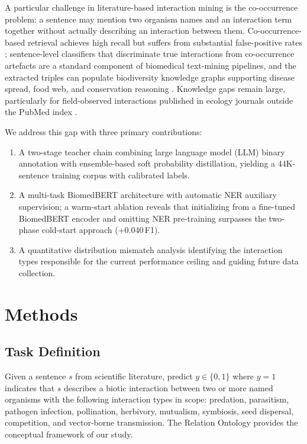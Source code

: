 \documentclass[a4paper,fleqn]{cas-sc}
\begin{document}
A particular challenge in literature-based interaction mining is the
co-occurrence problem: a sentence may mention two organism names and an
interaction term together without actually describing an interaction between
them. Co-occurrence-based retrieval achieves high recall but suffers from
substantial false-positive rates \citep{bunescu2005comparative};
sentence-level classifiers that discriminate true interactions from
co-occurrence artefacts are a standard component of biomedical
text-mining pipelines, and the extracted triples can populate biodiversity
knowledge graphs supporting disease spread, food web, and conservation
reasoning \citep{page2016biodiversity, poisot2021global}. Knowledge gaps
remain large, particularly for field-observed interactions published in
ecology journals outside the PubMed index \citep{poisot2021global}.

We address this gap with three primary contributions:
\begin{enumerate}
    \item A two-stage teacher chain combining large language model (LLM)
    binary annotation with ensemble-based soft probability distillation, yielding a
    44K-sentence training corpus with calibrated labels.
    \item A multi-task BiomedBERT architecture with automatic NER auxiliary
    supervision; a warm-start ablation reveals that initializing from a
    fine-tuned BiomedBERT encoder and omitting NER pre-training surpasses
    the two-phase cold-start approach (+0.040\,F1).
    \item A quantitative distribution mismatch analysis identifying the
    interaction types responsible for the current performance ceiling and
    guiding future data collection.
\end{enumerate}

\section{Methods}
\label{sec:methods}

\subsection{Task Definition}

Given a sentence $s$ from scientific literature, predict $y \in \{0, 1\}$
where $y=1$ indicates that $s$ describes a biotic interaction between two
or more named organisms with the following interaction types in scope: predation, parasitism,
pathogen infection, pollination, herbivory, mutualism, symbiosis, seed
dispersal, competition, and vector-borne transmission. 
The Relation Ontology provides the conceptual framework of our study.
\end{document}
